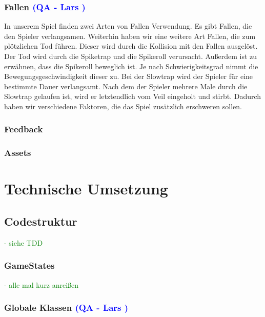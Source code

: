 \documentclass{article}
\begin{document}
\vspace{1cm}
\subsubsection{Fallen \textcolor{blue}{(QA - Lars )}}

In unserem Spiel finden zwei Arten von Fallen Verwendung. Es gibt Fallen, die den Spieler verlangsamen. Weiterhin haben wir eine
weitere Art Fallen, die zum plötzlichen Tod führen. Dieser wird durch die Kollision mit den Fallen ausgelöst. Der Tod wird durch die
Spiketrap und die Spikeroll verursacht. Außerdem ist zu erwähnen, dass die Spikeroll beweglich ist. Je nach Schwierigkeitsgrad nimmt
die Bewegungsgeschwindigkeit dieser zu. Bei der Slowtrap wird der Spieler für eine bestimmte Dauer verlangsamt. Nach dem der Spieler
mehrere Male durch die Slowtrap gelaufen ist, wird er letztendlich vom Veil eingeholt und stirbt. Dadurch haben wir verschiedene Faktoren,
die das Spiel zusätzlich erschweren sollen.

\vspace{1cm}
\subsubsection{Feedback}

\vspace{1cm}
\subsubsection{Assets}

\newpage
\section{Technische Umsetzung}

\vspace{2cm}
\subsection{Codestruktur}
\textcolor{green}{- siehe TDD}

\vspace{1cm}
\subsubsection{GameStates}
\textcolor{green}{- alle mal kurz anreißen}

\vspace{1cm}
\subsubsection{Globale Klassen \textcolor{blue}{(QA - Lars )}}
\end{document}
